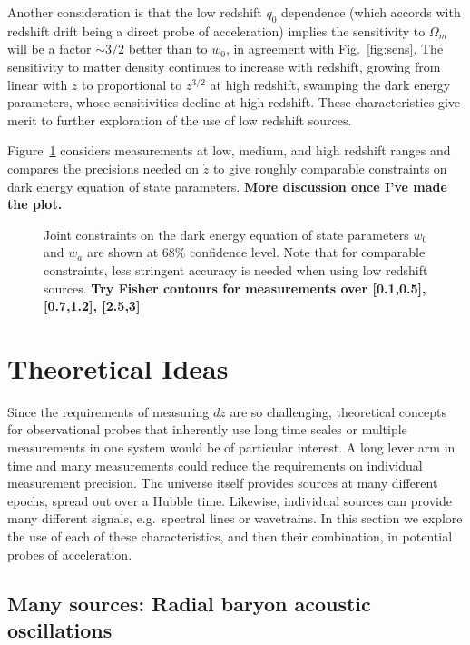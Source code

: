 \documentclass[preprint]{aastex}
\newcommand{\om}{\Omega_m}
\begin{document}
Another consideration is that the low redshift $q_0$ dependence (which 
accords with redshift drift being a direct probe of acceleration) implies 
the sensitivity to $\om$ will be a factor $\sim3/2$ better than to $w_0$, 
in agreement with Fig.~\ref{fig:sens}. The sensitivity to matter density 
continues to increase with redshift, growing from linear with $z$ to 
proportional to $z^{3/2}$ at high redshift, swamping the dark energy 
parameters, whose sensitivities decline at high redshift. These 
characteristics give merit to further exploration of the use of 
low redshift sources. 

Figure~\ref{fig:fisher} considers measurements at low, medium, and 
high redshift ranges and compares the precisions needed on $\dot z$ to 
give roughly comparable constraints on dark energy equation of state 
parameters. 
{\bf More discussion once I've made the plot.} 


\begin{figure}
   \centering
\caption{Joint constraints on the dark energy equation of state parameters 
$w_0$ and $w_a$ are shown at 68\% confidence level. Note that for comparable 
constraints, less stringent accuracy is needed when using low redshift 
sources. 
{\bf Try Fisher contours for measurements over [0.1,0.5], [0.7,1.2], [2.5,3]} 
}
\label{fig:fisher} 
\end{figure}




\section{Theoretical Ideas} \label{sec:methods} 

Since the requirements of measuring $dz$ are so challenging, theoretical 
concepts for observational probes that inherently use long time scales or 
multiple measurements in one system would be of particular interest. 
A long lever arm in time and many measurements could reduce the requirements 
on individual measurement precision.  The universe itself provides sources 
at many different epochs, spread out over a Hubble time.  Likewise, 
individual sources can provide many different signals, e.g.\ spectral lines 
or wavetrains.  In this section we explore the use of each of these 
characteristics, and then their combination, in potential probes of 
acceleration. 


\subsection{Many sources: Radial baryon acoustic oscillations} \label{sec:rbao} 
\end{document}
